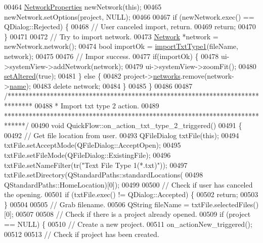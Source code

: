 \begin{DoxyCode}
00464   \hyperlink{class_network_properties}{NetworkProperties} newNetwork(\textcolor{keyword}{this});
00465   newNetwork.setOptions(project, NULL);
00466 
00467   \textcolor{keywordflow}{if} (newNetwork.exec() == QDialog::Rejected) \{
00468     \textcolor{comment}{// User canceled import, return.}
00469     \textcolor{keywordflow}{return};
00470   \}
00471 
00472   \textcolor{comment}{// Try to import network.}
00473   \hyperlink{class_network}{Network} *network = newNetwork.network();
00474   \textcolor{keywordtype}{bool} importOk = \hyperlink{import_8cpp_ab30ac380d5e14f830ebc8eb839fbbdf0}{importTxtType1}(fileName, network);
00475 
00476   \textcolor{comment}{// Impor success.}
00477   \textcolor{keywordflow}{if}(importOk) \{
00478     ui->systemView->addNetwork(network);
00479     ui->systemView->zoomFit();
00480     \hyperlink{group___window_ga4b63ea5ca52a9eea14db0a22b5a133f8}{setAltered}(\textcolor{keyword}{true});
00481   \} \textcolor{keywordflow}{else} \{
00482     project->\hyperlink{class_project_aa98126154cab59769a431668e6f17daf}{networks}.remove(network->\hyperlink{class_network_ab6643733a517f930c60b06f5ffd78186}{name});
00483     \textcolor{keyword}{delete} network;
00484   \}
00485 \}
00486 
00487 \textcolor{comment}{/*******************************************************************************}
00488 \textcolor{comment}{ * Import txt type 2 action.}
00489 \textcolor{comment}{ ******************************************************************************/}
00490 \textcolor{keywordtype}{void} QuickFlow::on\_action\_txt\_type\_2\_triggered()
00491 \{
00492   \textcolor{comment}{// Get file location from user.}
00493   QFileDialog txtFile(\textcolor{keyword}{this});
00494   txtFile.setAcceptMode(QFileDialog::AcceptOpen);
00495   txtFile.setFileMode(QFileDialog::ExistingFile);
00496   txtFile.setNameFilter(tr(\textcolor{stringliteral}{"Text File Type 1(*.txt)"}));
00497   txtFile.setDirectory(QStandardPaths::standardLocations(
00498                          QStandardPaths::HomeLocation)[0]);
00499 
00500   \textcolor{comment}{// Check if user has canceled the opening.}
00501   \textcolor{keywordflow}{if} (txtFile.exec() != QDialog::Accepted) \{
00502     \textcolor{keywordflow}{return};
00503   \}
00504 
00505   \textcolor{comment}{// Grab filename.}
00506   QString fileName = txtFile.selectedFiles()[0];
00507 
00508   \textcolor{comment}{// Check if there is a project already opened.}
00509   \textcolor{keywordflow}{if} (project == NULL) \{
00510     \textcolor{comment}{// Create a new project.}
00511     on\_actionNew\_triggered();
00512 
00513     \textcolor{comment}{// Check if project has been created.}

\end{DoxyCode}
